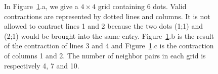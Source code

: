 \begin{figure}[!ht]
{
  }
	\caption{In Figure~\ref{fig:introduction:example}.a, we give a $4 \times 4$ grid containing 6 dots. Valid contractions are represented by dotted lines and columns. It is not allowed to contract lines 1 and 2 because the two dots (1;1) and (2;1) would be brought into the same entry. Figure~\ref{fig:introduction:example}.b is the result of the contraction of lines 3 and 4 and Figure~\ref{fig:introduction:example}.c is the contraction of columns 1 and 2. The number of neighbor pairs in each grid is respectively 4, 7 and 10.
  }
	\label{fig:introduction:example}
\end{figure}
\vspace{-0.3cm}
